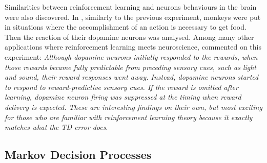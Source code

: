 			Similarities between reinforcement learning and neurons behaviours in the brain were also discovered. In \cite{Schultz1995,Schultz1998}, similarly to the previous experiment, monkeys were put in situations where the accomplishment of an action is necessary to get food. Then the reaction of their dopamine neurons was analysed. Among many other applications where reinforcement learning meets neuroscience, \cite{Doya2007} commented on this experiment: \textit{Although dopamine neurons initially responded to the rewards, when those rewards became fully predictable from preceding sensory cues, such as light and sound, their reward responses went away. Instead, dopamine neurons started to respond to reward-predictive sensory cues. If the reward is omitted after learning, dopamine neuron firing was suppressed at the timing when reward delivery is expected. These are interesting findings on their own, but most exciting for those who are familiar with reinforcement learning theory because it exactly matches what the TD error does}.
			
		\subsection{Markov Decision Processes}
        
